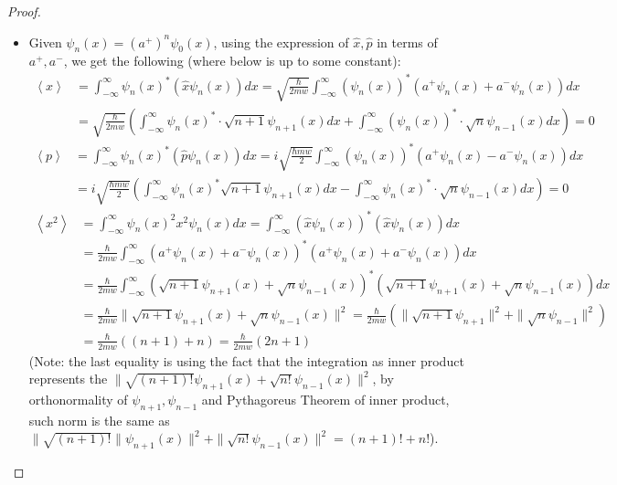 \documentclass{article}
\begin{document}
\begin{proof}
    \begin{itemize}
        \item[(a)] Given $\psi_n(x)=(a^+)^n\psi_0(x)$, using the expression of $\hat{x},\hat{p}$ in terms of $a^+,a^-$, we get the following (where below is up to some constant):
        \begin{align}
            \left<x\right>&=\int_{-\infty}^{\infty}\psi_n(x)^* (\hat{x}\psi_n(x))dx = \sqrt{\frac{\hbar}{2mw}}\int_{-\infty}^{\infty}(\psi_n(x))^*(a^+\psi_n(x)+a^-\psi_n(x))dx\\
            &= \sqrt{\frac{\hbar}{2mw}}\left(\int_{-\infty}^{\infty}\psi_n(x)^* \cdot \sqrt{n+1}\psi_{n+1}(x)dx + \int_{-\infty}^{\infty}(\psi_n(x))^*\cdot \sqrt{n}\psi_{n-1}(x) dx\right)= 0
        \end{align}
        \begin{align}
            \left<p\right>&=\int_{-\infty}^{\infty}\psi_n(x)^*(\hat{p}\psi_n(x))dx = i\sqrt{\frac{\hbar mw}{2}}\int_{-\infty}^{\infty}(\psi_n(x))^*(a^+\psi_n(x)-a^-\psi_n(x))dx\\
            &= i\sqrt{\frac{\hbar mw}{2}}\left(\int_{-\infty}^{\infty}\psi_n(x)^* \sqrt{n+1}\psi_{n+1}(x)dx - \int_{-\infty}^{\infty}\psi_n(x)^*\cdot \sqrt{n}\psi_{n-1}(x)dx\right)=0
        \end{align}
        \begin{align}
            \left<x^2\right> &= \int_{-\infty}^{\infty}\psi_n(x)^2 x^2 \psi_n(x)dx = \int_{-\infty}^{\infty}(\hat{x}\psi_n(x))^*(\hat{x}\psi_n(x))dx\\
            &= \frac{\hbar}{2mw}\int_{-\infty}^{\infty}(a^+\psi_n(x)+a^-\psi_n(x))^*(a^+\psi_n(x)+a^-\psi_n(x))dx\\
            &= \frac{\hbar}{2mw}\int_{-\infty}^{\infty}(\sqrt{n+1}\psi_{n+1}(x)+\sqrt{n}\psi_{n-1}(x))^*(\sqrt{n+1}\psi_{n+1}(x)+\sqrt{n}\psi_{n-1}(x)) dx\\
            &= \frac{\hbar}{2mw}\|\sqrt{n+1}\psi_{n+1}(x)+\sqrt{n}\psi_{n-1}(x)\|^2=\frac{\hbar}{2mw}(\|\sqrt{n+1}\psi_{n+1}\|^2+\|\sqrt{n}\psi_{n-1}\|^2)\\
            &= \frac{\hbar}{2mw}((n+1)+n)=\frac{\hbar}{2mw}(2n+1) 
        \end{align}
        (Note: the last equality is using the fact that the integration as inner product represents the $\|\sqrt{(n+1)!}\psi_{n+1}(x)+\sqrt{n!}\psi_{n-1}(x)\|^2$, by orthonormality of $\psi_{n+1},\psi_{n-1}$ and Pythagoreus Theorem of inner product, such norm is the same as $\|\sqrt{(n+1)!}\|\psi_{n+1}(x)\|^2+\|\sqrt{n!}\psi_{n-1}(x)\|^2 = (n+1)!+n!$).

\end{itemize}
\end{proof}
\end{document}
